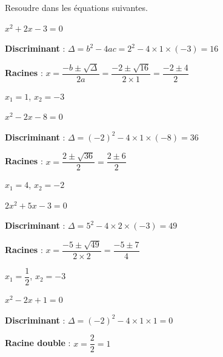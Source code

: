 \documentclass[11pt,a4paper]{article}  %
\begin{document}
Resoudre dans \R les équations suivantes.
\begin{enumMet}
	\item $x^2+2 x-3=0$
	\begin{corrBox}
		\begin{itemMet}
			\item \textbf{Discriminant} : \( \Delta = b^2 - 4ac = 2^2 - 4 \times 1 \times (-3) = 16 \)
			\item \textbf{Racines} : \( x = \dfrac{-b \pm \sqrt{\Delta}}{2a} = \dfrac{-2 \pm \sqrt{16}}{2 \times 1} = \dfrac{-2 \pm 4}{2} \)
			\item \( x_1 = 1 \), \( x_2 = -3 \)
		\end{itemMet}		
	\end{corrBox}
	\item $x^2-2 x-8=0$
	\begin{corrBox}
		\begin{itemMet}
			\item \textbf{Discriminant} : \( \Delta = (-2)^2 - 4 \times 1 \times (-8) = 36 \)
			\item \textbf{Racines} : \( x = \dfrac{2 \pm \sqrt{36}}{2} = \dfrac{2 \pm 6}{2} \)
			\item \( x_1 = 4 \), \( x_2 = -2 \)
		\end{itemMet}		
	\end{corrBox}
	\item $2 x^2+5 x-3=0$
	\begin{corrBox}
		\begin{itemMet}
			\item \textbf{Discriminant} : \( \Delta = 5^2 - 4 \times 2 \times (-3) = 49 \)
			\item \textbf{Racines} : \( x = \dfrac{-5 \pm \sqrt{49}}{2 \times 2} = \dfrac{-5 \pm 7}{4} \)
			\item \( x_1 = \dfrac{1}{2} \), \( x_2 = -3 \)
		\end{itemMet}		
	\end{corrBox}
	\item $x^2-2 x+1=0$
	\begin{corrBox}
		\begin{itemMet}
			\item \textbf{Discriminant} : \( \Delta = (-2)^2 - 4 \times 1 \times 1 = 0 \)
			\item \textbf{Racine double} : \( x = \dfrac{2}{2} = 1 \)
		\end{itemMet}		
	\end{corrBox}

\end{enumMet}
\end{document}
